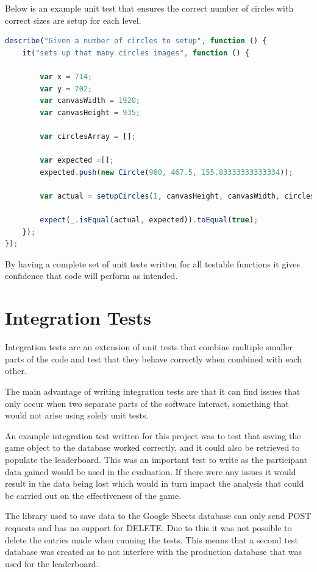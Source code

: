 \documentclass[12pt,a4paper]{report}
\begin{document}
Below is an example unit test that ensures the correct number of circles with correct sizes are setup for each level. 

\begin{minipage}{\linewidth}
\begin{lstlisting}[language=JavaScript]
describe("Given a number of circles to setup", function () {
    it("sets up that many circles images", function () {

        var x = 714;
        var y = 702;
        var canvasWidth = 1920;
        var canvasHeight = 935;

        var circlesArray = [];

        var expected =[];
        expected.push(new Circle(960, 467.5, 155.83333333333334));

        var actual = setupCircles(1, canvasHeight, canvasWidth, circlesArray);

        expect(_.isEqual(actual, expected)).toEqual(true);
    });
});
\end{lstlisting}
\end{minipage}

By having a complete set of unit tests written for all testable functions it gives confidence that code will perform as intended.

\section{Integration Tests}
Integration tests are an extension of unit tests that combine multiple smaller parts of the code and test that they behave correctly when combined with each other. 

The main advantage of writing integration tests are that it can find issues that only occur when two separate parts of the software interact, something that would not arise using solely unit tests. 

An example integration test written for this project was to test that saving the game object to the database worked correctly, and it could also be retrieved to populate the leaderboard. This was an important test to write as the participant data gained would be used in the evaluation. If there were any issues it would result in the data being lost which would in turn impact the analysis that could be carried out on the effectiveness of the game. 

The library used to save data to the Google Sheets database can only send POST requests and has no support for DELETE. Due to this it was not possible to delete the entries made when running the tests. This means that a second test database was created as to not interfere with the production database that was used for the leaderboard. 
\end{document}
